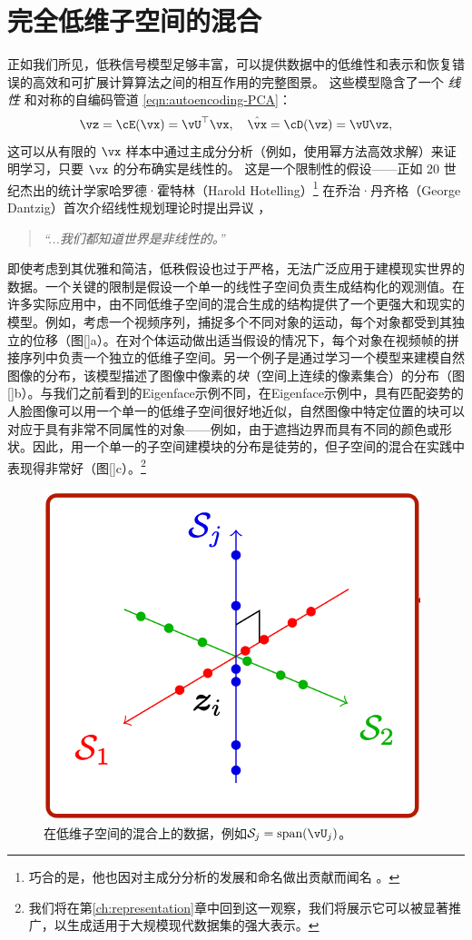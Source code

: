\documentclass[../../book-main.tex]{subfiles}
\begin{document}
\section{完全低维子空间的混合}%
\label{sec:ica}
正如我们所见，低秩信号模型足够丰富，可以提供数据中的低维性和表示和恢复错误的高效和可扩展计算算法之间的相互作用的完整图景。 
这些模型隐含了一个 \textit{线性} 和对称的自编码管道 \eqref{eqn:autoencoding-PCA}： 
\begin{equation*}
    \vz = \cE(\vx) = \vU^\top \vx, \quad \hat{\vx} = \cD(\vz) = \vU \vz,
\end{equation*}
这可以从有限的 $\vx$ 样本中通过主成分分析（例如，使用幂方法高效求解）来证明学习，只要 $\vx$ 的分布确实是线性的。
这是一个限制性的假设——正如 20 世纪杰出的统计学家哈罗德·霍特林（Harold Hotelling）\footnote{巧合的是，他也因对主成分分析的发展和命名做出贡献而闻名 \cite{Hotelling1933}。} 在乔治·丹齐格（George Dantzig）首次介绍线性规划理论时提出异议 \cite{Dantzig2002-eh}，
\begin{quote}
\centering
    \textit{“...我们都知道世界是非线性的。”}
\end{quote}

即使考虑到其优雅和简洁，低秩假设也过于严格，无法广泛应用于建模现实世界的数据。一个关键的限制是假设一个单一的线性子空间负责生成结构化的观测值。在许多实际应用中，由不同低维子空间的混合生成的结构提供了一个更强大和现实的模型。例如，考虑一个视频序列，捕捉多个不同对象的运动，每个对象都受到其独立的位移（图\ref{}a）。在对个体运动做出适当假设的情况下，每个对象在视频帧的拼接序列中负责一个独立的低维子空间\cite{VidalR2004-ECCV}。另一个例子是通过学习一个模型来建模自然图像的分布，该模型描述了图像中像素的\textit{块}（空间上连续的像素集合）的分布（图\ref{}b）。与我们之前看到的Eigenface示例不同，在Eigenface示例中，具有匹配姿势的人脸图像可以用一个单一的低维子空间很好地近似，自然图像中特定位置的块可以对应于具有非常不同属性的对象——例如，由于遮挡边界而具有不同的颜色或形状。因此，用一个单一的子空间建模块的分布是徒劳的，但子空间的混合在实践中表现得非常好（图\ref{}c）。\footnote{我们将在第\ref{ch:representation}章中回到这一观察，我们将展示它可以被显著推广，以生成适用于大规模现代数据集的强大表示。}

\begin{figure}
    \centering
    \includegraphics[width=0.35\linewidth]{chapters/subspaces.png}
    \caption{在低维子空间的混合上的数据，例如$\mathcal{S}_j = \mbox{span}(\vU_j)$。}
    \label{fig:subspaces}
\end{figure}
\end{document}
